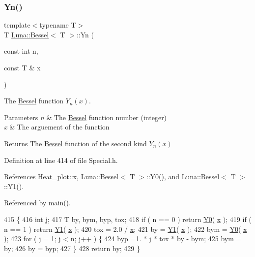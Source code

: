 \subsubsection{\texorpdfstring{Yn()}{Yn()}}
{\footnotesize\ttfamily template$<$typename T$>$ \\
T \hyperlink{structLuna_1_1Bessel}{Luna\+::\+Bessel}$<$ T $>$\+::Yn (\begin{DoxyParamCaption}\item[{const int}]{n,  }\item[{const T \&}]{x }\end{DoxyParamCaption})\hspace{0.3cm}{\ttfamily [inline]}}



The \hyperlink{structLuna_1_1Bessel}{Bessel} function $ Y_n(x) $. 


\begin{DoxyParams}{Parameters}
{\em n} & The \hyperlink{structLuna_1_1Bessel}{Bessel} function number (integer) \\
\hline
{\em x} & The arguement of the function \\
\hline
\end{DoxyParams}
\begin{DoxyReturn}{Returns}
The \hyperlink{structLuna_1_1Bessel}{Bessel} function of the second kind $ Y_n(x) $ 
\end{DoxyReturn}


Definition at line 414 of file Special.\+h.



References Heat\+\_\+plot\+::x, Luna\+::\+Bessel$<$ T $>$\+::\+Y0(), and Luna\+::\+Bessel$<$ T $>$\+::\+Y1().



Referenced by main().


\begin{DoxyCode}
415       \{
416         \textcolor{keywordtype}{int} j;
417         T by, bym, byp, tox;
418         \textcolor{keywordflow}{if} ( n == 0 ) \textcolor{keywordflow}{return} \hyperlink{structLuna_1_1Bessel_aaa4710f118acafa90f55c1a93b3748da}{Y0}( \hyperlink{namespaceHeat__plot_aa88370c16b85b784ccbde3ed88bc1991}{x} );
419         \textcolor{keywordflow}{if} ( n == 1 ) \textcolor{keywordflow}{return} \hyperlink{structLuna_1_1Bessel_ab93c15c62695c56fd1d399a00e9a124a}{Y1}( \hyperlink{namespaceHeat__plot_aa88370c16b85b784ccbde3ed88bc1991}{x} );
420         tox = 2.0 / \hyperlink{namespaceHeat__plot_aa88370c16b85b784ccbde3ed88bc1991}{x};
421         by = \hyperlink{structLuna_1_1Bessel_ab93c15c62695c56fd1d399a00e9a124a}{Y1}( \hyperlink{namespaceHeat__plot_aa88370c16b85b784ccbde3ed88bc1991}{x} );
422         bym = \hyperlink{structLuna_1_1Bessel_aaa4710f118acafa90f55c1a93b3748da}{Y0}( \hyperlink{namespaceHeat__plot_aa88370c16b85b784ccbde3ed88bc1991}{x} );
423         \textcolor{keywordflow}{for} ( j = 1; j < n; j++ ) \{
424             byp =1. * j * tox * by - bym;
425             bym = by;
426             by = byp;
427         \}
428         \textcolor{keywordflow}{return} by;
429       \}
\end{DoxyCode}


